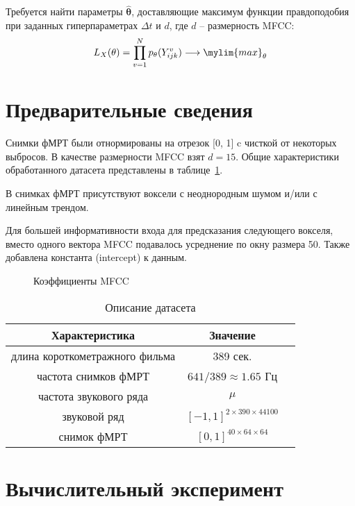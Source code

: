 \documentclass[12pt, twoside]{article}
\begin{document}
Требуется найти параметры $\mathbf{\widehat\theta}$, доставляющие максимум функции правдоподобия при заданных гиперпараметрах $\Delta t$ и $d$, где $d$ -- размерность MFCC:
\begin{equation}
	\label{eq9}
	L_X(\theta) = \prod\limits_{v=1}^N p_\theta(Y_{ijk}^v) \longrightarrow \mylim{max}_\theta
\end{equation}

\section{Предварительные сведения}

Снимки фМРТ были отнормированы на отрезок [0, 1] c чисткой от некоторых выбросов. В качестве размерности MFCC взят $d = 15$. Общие характеристики обработанного датасета представлены в таблице~\ref{table:sample}.

В снимках фМРТ присутствуют воксели с неоднородным шумом и/или с линейным трендом.

Для большей информативности входа для предсказания следующего вокселя, вместо одного вектора MFCC подавалось усреднение по окну размера 50. Также добавлена константа (intercept) к данным.
\begin{figure}[h!]
	\caption{Коэффициенты MFCC}
	\label{fig:example}
\end{figure}

\begin{table}[h!]
	\centering
	\caption{Описание датасета}
	\begin{tabular}{|c|c|c|}
		\hline
		Характеристика                       & Значение            \\
		\hline \hline
		длина короткометражного фильма         & 389 сек.                \\ \hline
		частота снимков фМРТ           & $641 / 389 \approx 1.65$ Гц   \\ \hline
		частота звукового ряда           & $\mu$ \\ \hline
		звуковой ряд       & $[-1, 1]^{2 \times 390 \times 44100}$         \\ \hline
		снимок фМРТ             & $[0, 1]^{40 \times 64 \times 64}$           \\ \hline
	\end{tabular}
	\label{table:sample}
\end{table}


\section{Вычислительный эксперимент}
\end{document}
